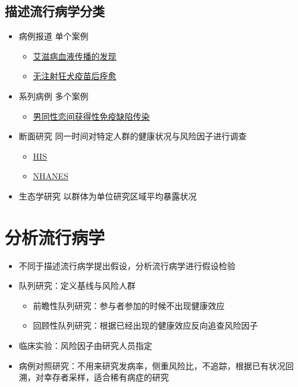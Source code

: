 \documentclass[]{book}
\providecommand{\tightlist}{%
  \setlength{\itemsep}{0pt}\setlength{\parskip}{0pt}}
\begin{document}
\hypertarget{ux63cfux8ff0ux6d41ux884cux75c5ux5b66ux5206ux7c7b}{%
\subsection{描述流行病学分类}\label{ux63cfux8ff0ux6d41ux884cux75c5ux5b66ux5206ux7c7b}}

\begin{itemize}
\tightlist
\item
  病例报道 单个案例

  \begin{itemize}
  \tightlist
  \item
    \href{http://www.thelancet.com/journals/lancet/article/PIIS0140-6736(83)92082-2/abstract\#}{艾滋病血液传播的发现}
  \item
    \href{http://www.nejm.org/doi/full/10.1056/NEJMoa050382\#t=abstract}{无注射狂犬疫苗后痊愈}
  \end{itemize}
\item
  系列病例 多个案例

  \begin{itemize}
  \tightlist
  \item
    \href{http://www.nejm.org/doi/pdf/10.1056/NEJM198112103052401}{男同性恋间获得性免疫缺陷传染}
  \end{itemize}
\item
  断面研究 同一时间对特定人群的健康状况与风险因子进行调查

  \begin{itemize}
  \tightlist
  \item
    \href{http://www.cdc.gov/nchs/nhis.htm}{HIS}
  \item
    \href{http://www.cdc.gov/nchs/nhanes.htm}{NHANES}
  \end{itemize}
\item
  生态学研究 以群体为单位研究区域平均暴露状况
\end{itemize}

\hypertarget{ux5206ux6790ux6d41ux884cux75c5ux5b66}{%
\section{分析流行病学}\label{ux5206ux6790ux6d41ux884cux75c5ux5b66}}

\begin{itemize}
\tightlist
\item
  不同于描述流行病学提出假设，分析流行病学进行假设检验
\item
  队列研究：定义基线与风险人群

  \begin{itemize}
  \tightlist
  \item
    前瞻性队列研究：参与者参加的时候不出现健康效应
  \item
    回顾性队列研究：根据已经出现的健康效应反向追查风险因子
  \end{itemize}
\item
  临床实验：风险因子由研究人员指定
\item
  病例对照研究：不用来研究发病率，侧重风险比，不追踪，根据已有状况回溯，对幸存者采样，适合稀有病症的研究
\end{itemize}
\end{document}
